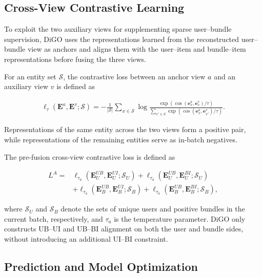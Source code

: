 \documentclass[letterpaper]{article}
\begin{document}
\subsection{Cross-View Contrastive Learning}

To exploit the two auxiliary views for supplementing sparse
user--bundle supervision, DiGO uses the representations learned
from the reconstructed user--bundle view as anchors and aligns
them with the user--item and bundle--item representations before
fusing the three views.

For an entity set $\mathcal S$, the contrastive loss between an
anchor view $a$ and an auxiliary view $v$ is defined as

\begin{equation}
\begin{aligned}
\ell_{\tau}
\left(
\mathbf E^{a},
\mathbf E^{v};
\mathcal S
\right)
=
-\frac{1}{|\mathcal S|}
\sum_{x\in\mathcal S}
\log
\frac{
\exp
\left(
\cos(\mathbf e_x^{a},\mathbf e_x^{v})/\tau
\right)
}{
\sum_{x'\in\mathcal S}
\exp
\left(
\cos(\mathbf e_x^{a},\mathbf e_{x'}^{v})/\tau
\right)
}.
\end{aligned}
\tag{8}
\end{equation}

Representations of the same entity across the two views form a
positive pair, while representations of the remaining entities
serve as in-batch negatives.

The pre-fusion cross-view contrastive loss is defined as

\begin{equation}
\begin{aligned}
L^{A}
={}&
\ell_{\tau_a}
\left(
\mathbf E_U^{UB},
\mathbf E_U^{UI};
\mathcal S_U
\right)
+
\ell_{\tau_a}
\left(
\mathbf E_U^{UB},
\mathbf E_U^{BI};
\mathcal S_U
\right)
\\
&+
\ell_{\tau_a}
\left(
\mathbf E_B^{UB},
\mathbf E_B^{UI};
\mathcal S_B
\right)
+
\ell_{\tau_a}
\left(
\mathbf E_B^{UB},
\mathbf E_B^{BI};
\mathcal S_B
\right),
\end{aligned}
\tag{9}
\end{equation}

where $\mathcal S_U$ and $\mathcal S_B$ denote the sets of
unique users and positive bundles in the current batch,
respectively, and $\tau_a$ is the temperature parameter. DiGO
only constructs UB--UI and UB--BI alignment on both the user and
bundle sides, without introducing an additional UI--BI
constraint.


\subsection{Prediction and Model Optimization}
\end{document}
